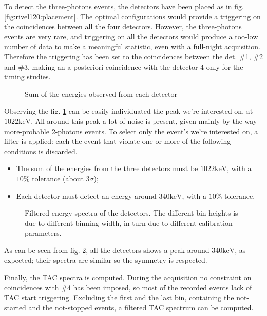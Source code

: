 \documentclass[11pt,a4 paper]{article}
\begin{document}
To detect the three-photons events, the detectors have been placed as in fig. \ref{fig:rivel120:placement}. The optimal configurations would provide a triggering on the coincidences between all the four detectors. However, the three-photons events are very rare, and triggering on all the detectors would produce a too-low number of data to make a meaningful statistic, even with a full-night acquisition. Therefore the triggering has been set to the coincidences between the det. \#1, \#2 and \#3, making an a-posteriori coincidence with the detector 4 only for the timing studies.

\begin{figure}[H]
    \centering
    \caption{Sum of the energies observed from each detector}
    \label{fig:sum:3gamma}
\end{figure}

Observing the fig. \ref{fig:sum:3gamma} can be easily individuated the peak we're interested on, at $1022\si{\kilo\electronvolt}$. All around this peak a lot of noise is present, given mainly by the way-more-probable 2-photons events. To select only the event's we're interested on, a filter is applied: each the event that violate one or more of the following conditions is discarded.
\begin{itemize}
    \item The sum of the energies from the three detectors must be $1022\si{\kilo\electronvolt}$, with a $10\%$ tolerance (about $3\sigma$);
    \item Each detector must detect an energy around $340\si{\kilo\electronvolt}$, with a $10\%$ tolerance.
\end{itemize}

\begin{figure}[H]
    \centering
    \caption{Filtered energy spectra of the detectors. The different bin heights is due to different binning width, in turn due to different calibration parameters.}
    \label{fig:alldet:3gamma}
\end{figure}

As can be seen from fig. \ref{fig:alldet:3gamma}, all the detectors shows a peak around $340\si{\kilo\electronvolt}$, as expected; their spectra are similar so the symmetry is respected.

Finally, the TAC spectra is computed. During the acquisition no constraint on coincidences with \#4 has been imposed, so most of the recorded events lack of TAC start triggering. Excluding the first and the last bin, containing the not-started and the not-stopped events, a filtered TAC spectrum can be computed.
\end{document}
